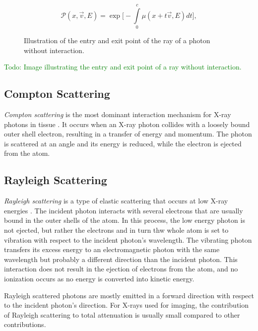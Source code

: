 $$\mathcal{P}(x, \vec{v}, E) = \exp \bigg[ -\int\limits_{0}^{c}{\mu(x+t\vec{v}, E)} dt \bigg],$$

\begin{figure}[H]
    \centering
    \caption{Illustration of the entry and exit point of the ray of a photon without interaction.}
    \label{fig:exit_point}
\end{figure}

\textcolor{green}{Todo: Image illustrating the entry and exit point of a ray without interaction.}


\subsection{Compton Scattering}
\emph{Compton scattering} is the most dominant interaction mechanism for X-ray
photons in tissue \cite[Chap. 7]{medicalImagingSystemsIntro2019:}. It occurs
when an X-ray photon collides with a loosely bound outer shell electron,
resulting in a transfer of energy and momentum. The photon is scattered at an
angle and its energy is reduced, while the electron is ejected from the atom.

\subsection{Rayleigh Scattering}
\emph{Rayleigh scattering} is a type of elastic scattering that occurs at low X-ray energies \cite[Chap. 7]{medicalImagingSystemsIntro2019:}. The incident photon interacts with several electrons that are
usually bound in the outer shells of the atom. In this process, the low energy photon is not ejected, but rather the electrons and in turn thw whole atom is
set to vibration with respect to the incident photon’s wavelength. The vibrating photon transfers its excess energy to an electromagnetic photon with the same wavelength but probably a different direction than the incident photon. This interaction does not result in the ejection of electrons from the atom, and no ionization occurs as no energy is converted into kinetic energy.


 Rayleigh scattered photons are
mostly emitted in a forward direction with respect to the incident photon’s
direction. For X-rays used for imaging, the contribution of Rayleigh scattering
to total attenuation is usually small compared to other contributions.